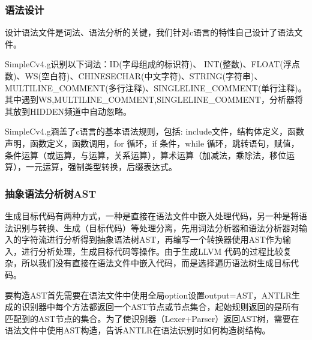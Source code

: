 \documentclass[a4paper]{article}
\begin{document}
\begin{CJK*}{UTF8}{gbsn}
    \subsubsection{语法设计}
    设计语法文件是词法、语法分析的关键，我们针对c语言的特性自己设计了语法文件。
    \par SimpleCv4.g识别以下词法：ID(字母组成的标识符)、 INT(整数)、FLOAT(浮点数)、WS(空白符)、CHINESECHAR(中文字符)、STRING(字符串)、MULTILINE\_COMMENT(多行注释)、SINGLELINE\_COMMENT(单行注释)。其中遇到WS,MULTILINE\_COMMENT,SINGLELINE\_COMMENT，分析器将其放到HIDDEN频道中自动忽略。
    \par SimpleCv4.g涵盖了c语言的基本语法规则，包括: include文件，结构体定义，函数声明，函数定义，函数调用，for 循环，if 条件，while 循环，跳转语句，赋值，条件运算（或运算，与运算，关系运算），算术运算（加减法，乘除法，移位运算），一元运算，强制类型转换，后缀表达式。

    \subsubsection{抽象语法分析树AST}
    生成目标代码有两种方式，一种是直接在语法文件中嵌入处理代码，另一种是将语法识别与转换、生成（目标代码）等处理分离，先用词法分析器和语法分析器对输入的字符流进行分析得到抽象语法树AST，再编写一个转换器使用AST作为输入，进行分析处理，生成目标代码等操作。由于生成LLVM 代码的过程比较复杂，所以我们没有直接在语法文件中嵌入代码，而是选择遍历语法树生成目标代码。
    \par 要构造AST首先需要在语法文件中使用全局option设置output=AST，ANTLR生成的识别器中每个方法都返回一个AST节点或节点集合，起始规则返回的是所有匹配到的AST节点的集合。为了使识别器（Lexer+Parser）返回AST树，需要在语法文件中使用AST构造，告诉ANTLR在语法识别时如何构造树结构。


\end{CJK*}
\end{document}

